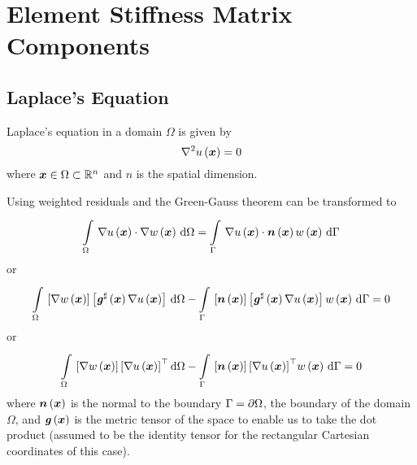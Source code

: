 \chapter{Element Stiffness Matrix Components}
\label{app:ElementStiffnessMatrixComponents}

\section{Laplace's Equation}
\label{sec:ElementStiffnessMatrixLaplace}

Laplace's equation in a domain $\Omega$ is given by  \ie
\begin{equation}
  \laplacian{}{\fnof{u}{\vectr{x}}}=0
\end{equation}
where $\vectr{x}\in\Omega\subset\rntopology{n}$ and $n$ is the spatial dimension.

Using weighted residuals and the Green-Gauss theorem
 can be transformed to
 \ie
\begin{equation}
  \gint{\Omega}{}{\dotprod{\gradient{}{\fnof{u}{\vectr{x}}}}{\gradient{}{\fnof{w}{\vectr{x}}}}}{\Omega}=
  \gint{\Gamma}{}{\dotprod{\gradient{}{\fnof{u}{\vectr{x}}}}{\fnof{\normal}{\vectr{x}}}\fnof{w}{\vectr{x}}}{\Gamma}
\end{equation}
or
\begin{equation}
  \gint{\Omega}{}{\sqbrac{\gradient{}{\fnof{w}{\vectr{x}}}}\sqbrac{\fnof{\sharptensor{\generalmetrictensor}}{\vectr{x}}\gradient{}{\fnof{u}{\vectr{x}}}}}{\Omega}-
  \gint{\Gamma}{}{\sqbrac{\fnof{\normal}{\vectr{x}}}\sqbrac{\fnof{\sharptensor{\generalmetrictensor}}{\vectr{x}}\gradient{}{\fnof{u}{\vectr{x}}}}\fnof{w}{\vectr{x}}}{\Gamma}=0
\end{equation}
or
\begin{equation}
  \gint{\Omega}{}{\sqbrac{\gradient{}{\fnof{w}{\vectr{x}}}}\transpose{\sqbrac{\gradient{}{\fnof{u}{\vectr{x}}}}}}{\Omega}-
  \gint{\Gamma}{}{\sqbrac{\fnof{\normal}{\vectr{x}}}\transpose{\sqbrac{\gradient{}{\fnof{u}{\vectr{x}}}}}\fnof{w}{\vectr{x}}}{\Gamma}=0
  \label{eqn:ElementMatricesLaplaceStartingEqution}
\end{equation}
where $  \boldsymbol{n} \left(  \boldsymbol{x}  \right) $ is the normal to the boundary
$\Gamma= \partial{\Omega} $, the boundary of the domain $\Omega$, and
$  \boldsymbol{\mathit{ g }} \left(  \boldsymbol{x}  \right) $ is the metric tensor of the
space to enable us to take the dot product (assumed to be the identity
tensor for the rectangular Cartesian coordinates of this case).

